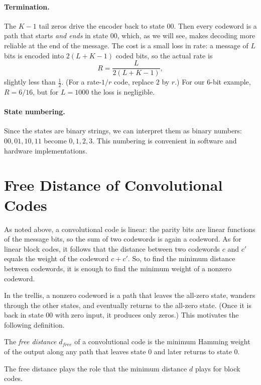\paragraph{Termination.} The \(K-1\) tail zeros drive the encoder back to state \(00\). Then every codeword is a path that starts \emph{and ends} in state \(00\), which, as we will see, makes decoding more reliable at the end of the message. The cost is a small loss in rate: a message of \(L\) bits is encoded into \(2(L + K - 1)\) coded bits, so the actual rate is
\[R = \frac{L}{2(L + K - 1)},\]
slightly less than \(\frac{1}{2}\). (For a rate-\(1/r\) code, replace \(2\) by \(r\).) For our 6-bit example, \(R = 6/16\), but for \(L = 1000\) the loss is negligible.

\paragraph{State numbering.} Since the states are binary strings, we can interpret them as binary numbers: \(00, 01, 10, 11\) become \(0, 1, 2, 3\). This numbering is convenient in software and hardware implementations.

\section{Free Distance of Convolutional Codes}\label{sec:dfree}
As noted above, a convolutional code is linear: the parity bits are linear functions of the message bits, so the sum of two codewords is again a codeword. As for linear block codes, it follows that the distance between two codewords \(c\) and \(c'\) equals the weight of the codeword \(c + c'\). So, to find the minimum distance between codewords, it is enough to find the minimum weight of a nonzero codeword.

In the trellis, a nonzero codeword is a path that leaves the all-zero state, wanders through the other states, and eventually returns to the all-zero state. (Once it is back in state \(00\) with zero input, it produces only zeros.) This motivates the following definition.

\begin{definition}
The \emph{free distance} \(d_{free}\) of a convolutional code is the minimum Hamming weight of the output along any path that leaves state \(0\) and later returns to state \(0\).
\end{definition}

The free distance plays the role that the minimum distance \(d\) plays for block codes.

